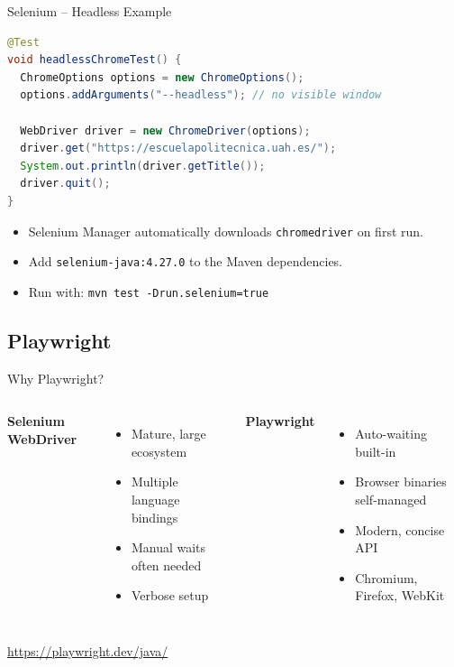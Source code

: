 \documentclass[11pt, xcolor=svgnames]{beamer}
\begin{document}

\begin{frame}[fragile]{Selenium -- Headless Example}

\begin{lstlisting}[language=Java,basicstyle=\scriptsize]
@Test
void headlessChromeTest() {
  ChromeOptions options = new ChromeOptions();
  options.addArguments("--headless"); // no visible window

  WebDriver driver = new ChromeDriver(options);
  driver.get("https://escuelapolitecnica.uah.es/");
  System.out.println(driver.getTitle());
  driver.quit();
}
\end{lstlisting}

\begin{itemize}
  \item Selenium Manager automatically downloads \texttt{chromedriver} on first run.
  \item Add \texttt{selenium-java:4.27.0} to the Maven dependencies.
  \item Run with: \texttt{mvn test -Drun.selenium=true}
\end{itemize}

\end{frame}


\subsection{Playwright}


\begin{frame}{Why Playwright?}

\begin{columns}
  \textbf{Selenium WebDriver}
  \begin{itemize}\small
    \item Mature, large ecosystem
    \item Multiple language bindings
    \item Manual waits often needed
    \item Verbose setup
  \end{itemize}
  \textbf{Playwright}
  \begin{itemize}\small
    \item Auto-waiting built-in
    \item Browser binaries self-managed
    \item Modern, concise API
    \item Chromium, Firefox, WebKit
  \end{itemize}
\end{columns}

\vspace{0.5em}
\centering \url{https://playwright.dev/java/}

\end{frame}
\end{document}
